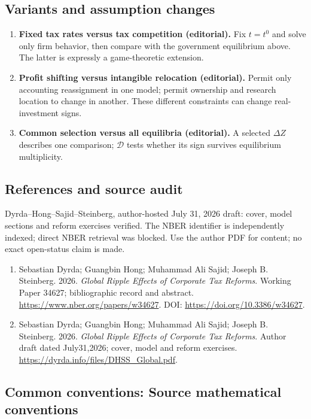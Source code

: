 \documentclass[11pt,a4paper]{article}
\begin{document}
\subsection*{Variants and assumption changes}
\begin{enumerate}
\item \textbf{Fixed tax rates versus tax competition (editorial).} Fix \(t=t^0\) and solve only firm behavior, then compare with the government equilibrium above. The latter is expressly a game-theoretic extension.
\item \textbf{Profit shifting versus intangible relocation (editorial).} Permit only accounting reassignment in one model; permit ownership and research location to change in another. These different constraints can change real-investment signs.
\item \textbf{Common selection versus all equilibria (editorial).} A selected \(\Delta Z\) describes one comparison; \(\mathcal D\) tests whether its sign survives equilibrium multiplicity.
\end{enumerate}
\subsection*{References and source audit}
Dyrda--Hong--Sajid--Steinberg, author-hosted July 31, 2026 draft: cover, model sections and reform exercises verified. The NBER identifier is independently indexed; direct NBER retrieval was blocked. Use the author PDF for content; no exact open-status claim is made.
\begin{enumerate}\raggedright
\item\hypertarget{definitions:source:30007757:1}{} Sebastian Dyrda; Guangbin Hong; Muhammad Ali Sajid; Joseph B. Steinberg. 2026. \emph{Global Ripple Effects of Corporate Tax Reforms}. Working Paper 34627; bibliographic record and abstract.
\url{https://www.nber.org/papers/w34627}.
DOI: \url{https://doi.org/10.3386/w34627}.
\item\hypertarget{definitions:source:30007757:2}{} Sebastian Dyrda; Guangbin Hong; Muhammad Ali Sajid; Joseph B. Steinberg. 2026. \emph{Global Ripple Effects of Corporate Tax Reforms}. Author draft dated July31,2026; cover, model and reform exercises.
\url{https://dyrda.info/files/DHSS_Global.pdf}.
\end{enumerate}

\subsection*{Common conventions: Source mathematical conventions}
\end{document}
